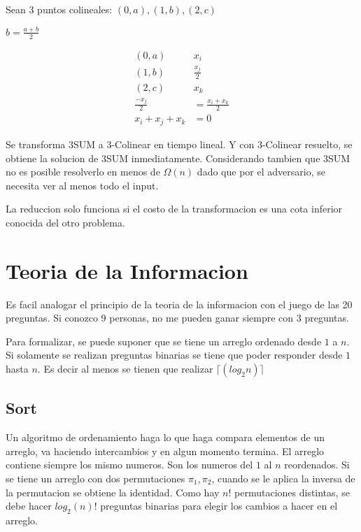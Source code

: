 \documentclass[12pt]{article}
\begin{document}
Sean $3$ puntos colineales: $(0,a), (1,b), (2,c)$

$b = \frac{a+b}{2}$

\begin{align}
(0,a) & x_i \\
(1,b) & \frac{x_j}{2} \\
(2,c) & x_k \\
\frac{-x_j}{2} &= \frac{x_i + x_k}{2} \\
x_i + x_j + x_k &= 0
\end{align}

Se transforma 3SUM a 3-Colinear en tiempo lineal. Y con 3-Colinear resuelto, se obtiene la solucion de 3SUM inmediatamente. Considerando tambien que 3SUM no es posible resolverlo en menos de $\Omega(n)$ dado que por el adversario, se necesita ver al menos todo el input.

La reduccion solo funciona si el costo de la transformacion es una cota inferior conocida del otro problema.

\section{Teoria de la Informacion}

Es facil analogar el principio de la teoria de la informacion con el juego de las 20 preguntas. Si conozco 9 personas, no me pueden ganar siempre con 3 preguntas.

Para formalizar, se puede suponer que se tiene un arreglo ordenado desde $1$ a $n$. Si solamente se realizan preguntas binarias se tiene que poder responder desde $1$ hasta $n$. Es decir al menos se tienen que realizar $ \lceil (log_2n) \rceil $

\subsection{Sort}

Un algoritmo de ordenamiento haga lo que haga compara elementos de un arreglo, va haciendo intercambios y en algun momento termina. El arreglo contiene siempre los mismo numeros. Son los numeros del $1$ al $n$ reordenados. 
Si se tiene un arreglo con dos permutaciones $\pi_1, \pi_2$, cuando se le aplica la inversa de la permutacion se obtiene la identidad. Como hay $n!$ permutaciones distintas, se debe hacer $log_2(n)!$ preguntas binarias para elegir los cambios a hacer en el arreglo.
\end{document}
